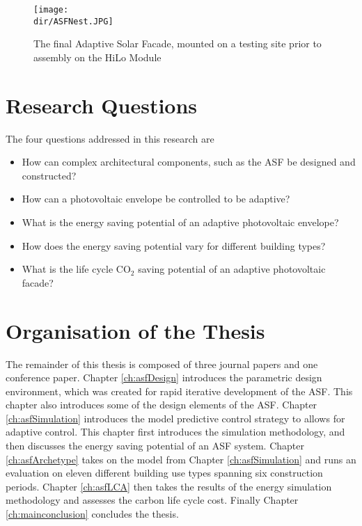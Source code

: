 \begin{figure}
\begin{center}
\texttt{[image: \\dir/ASFNest.JPG]}
\caption{The final Adaptive Solar Facade, mounted on a testing site prior to assembly on the HiLo Module}
\label{fig:ASFNest}
\end{center}
\end{figure}


\newpage

\section{Research Questions}

The four questions addressed in this research are 

\begin{itemize}
\item How can complex architectural components, such as the ASF be designed and constructed? 
\item How can a photovoltaic envelope be controlled to be adaptive?
\item What is the energy saving potential of an adaptive photovoltaic envelope?
\item How does the energy saving potential vary for different building types?
\item What is the life cycle CO$_2$ saving potential of an adaptive photovoltaic facade?

\end{itemize}

\section{Organisation of the Thesis}

The remainder of this thesis is composed of three journal papers and one conference paper. Chapter \ref{ch:asfDesign} introduces the parametric design environment, which was created for rapid iterative development of the ASF. This chapter also introduces some of the design elements of the ASF. Chapter \ref{ch:asfSimulation} introduces the model predictive control strategy to allows for adaptive control. This chapter first introduces the simulation methodology, and then discusses the energy saving potential of an ASF system. Chapter \ref{ch:asfArchetype} takes on the model from Chapter \ref{ch:asfSimulation} and runs an evaluation on eleven different building use types spanning six construction periods. Chapter \ref{ch:asfLCA} then takes the results of the energy simulation methodology and assesses the carbon life cycle cost. Finally Chapter \ref{ch:mainconclusion} concludes the thesis. 